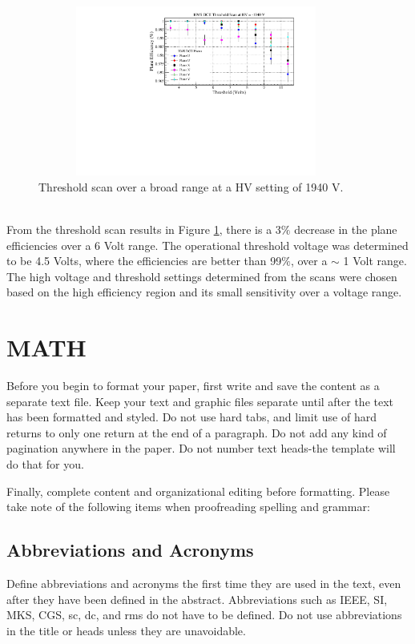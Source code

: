 \documentclass[letterpaper, 10 pt, conference]{ieeeconf}  %
\begin{document}
\begin{figure}[h!]
  \centering
  \includegraphics[width=4.1in, height=2.2in]{dc2_tests/dc2_thrsscan_HV_1940V.pdf}
  \caption{Threshold scan over a broad range at a HV setting of 1940 V.}
  \label{fig:hdc2_thrsscan}
\end{figure} \\
From the threshold scan results in Figure \ref{fig:hdc2_thrsscan}, there is a 3$\%$ decrease in the plane efficiencies over a
6 Volt range. The operational threshold voltage was determined to be 4.5 Volts, where the efficiencies are better than 99$\%$, over a $\sim$ 1 Volt range.
The high voltage and threshold settings determined from the scans were chosen based on the high efficiency region and its small sensitivity over a voltage range.  


\section{MATH}

Before you begin to format your paper, first write and save the content as a separate text file. Keep your text and graphic files separate until after the text has been formatted and styled. Do not use hard tabs, and limit use of hard returns to only one return at the end of a paragraph. Do not add any kind of pagination anywhere in the paper. Do not number text heads-the template will do that for you.

Finally, complete content and organizational editing before formatting. Please take note of the following items when proofreading spelling and grammar:

\subsection{Abbreviations and Acronyms} Define abbreviations and acronyms the first time they are used in the text, even after they have been defined in the abstract. Abbreviations such as IEEE, SI, MKS, CGS, sc, dc, and rms do not have to be defined. Do not use abbreviations in the title or heads unless they are unavoidable.
\end{document}
